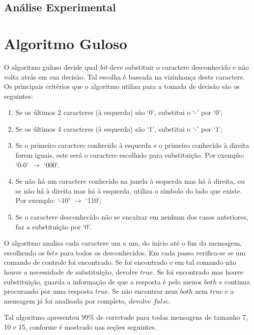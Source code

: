 \documentclass[a4paper,12pt,titlepage]{article}
\begin{document}
\subsection{Análise Experimental}

\section{Algoritmo Guloso}

O algoritmo guloso decide qual \textit{bit} deve substituir o caractere desconhecido e não volta atrás em sua decisão. Tal escolha é baseada na vizinhança deste caractere. Os principais critérios que o algoritmo utiliza para a tomada de decisão são os seguintes:

\begin{enumerate}[leftmargin=1.5cm]
    \item Se os últimos 2 caracteres (à esquerda) são `0', substitui o `-' por `0';
    \item Se os últimos 4 caracteres (à esquerda) são `1', substitui o `-' por `1';  
    \item Se o primeiro caractere conhecido à esquerda e o primeiro conhecido à direita forem iguais, este será o caractere escolhido para substituição. Por exemplo: `0-0' $\rightarrow$ `000'. 
    \item Se não há um caractere conhecido na janela à esquerda mas há à direita, ou se não há à direita mas há à esquerda, utiliza o símbolo do lado que existe. Por exemplo: `-10' $\rightarrow$ `110'; 
    \item Se o caractere desconhecido não se encaixar em nenhum dos casos anteriores, faz a substituição por `0'.
\end{enumerate}

O algoritmo analisa cada caractere um a um, do início até o fim da mensagem, escolhendo os $bits$ para todos os desconhecidos. Em cada passo verifica-se se um comando de controle foi encontrado. Se foi encontrado e em tal comando não houve a necessidade de substituição, devolve $true$. Se foi encontrado mas houve substituição, guarda a informação de que a resposta é pelo menos $both$ e continua procurando por uma resposta $true$. Se não encontrar nem $both$ nem $true$ e a mensagem já foi analisada por completo, devolve $false$.

Tal algoritmo apresentou 99\% de corretude para todas mensagens de tamanho 7, 10 e 15, conforme é mostrado nas seções seguintes.

\newpage
\end{document}
